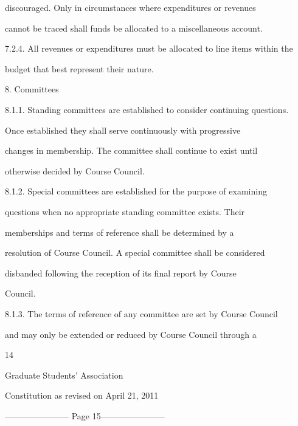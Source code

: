\documentclass{article}
\begin{document}
discouraged.  Only  in  circumstances  where  expenditures  or  revenues  

cannot be traced shall funds be allocated to a miscellaneous account.  



7.2.4. All revenues or expenditures must be allocated to line items within the  

budget that best represent their nature.  



  



8.  Committees  



8.1.1.  Standing committees are established to consider continuing questions.  

Once   established   they   shall   serve   continuously   with   progressive  

changes  in  membership.  The  committee  shall  continue  to  exist  until  

otherwise decided by Course Council.  



8.1.2.  Special  committees  are  established  for  the  purpose  of  examining  

questions   when   no   appropriate   standing   committee   exists.   Their  

memberships   and   terms   of   reference   shall   be   determined   by   a  

resolution of Course Council. A special committee shall be considered  

disbanded   following   the   reception   of   its   final   report   by   Course  

Council.  



8.1.3. The  terms  of  reference  of  any  committee  are  set  by  Course  Council  

and  may  only  be  extended  or  reduced  by  Course  Council  through  a  



 

      14  



Graduate Students’ Association  



   Constitution as revised on April 21, 2011  


----------------------- Page 15-----------------------
\end{document}
